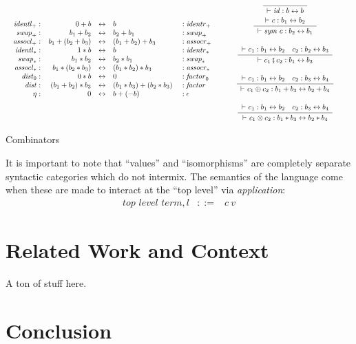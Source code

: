 \documentclass[authoryear,preprint]{sigplanconf}
\newcommand{\Rule}[4]{
\makebox{{\rm #1}
$\displaystyle
\frac{\begin{array}{l}#2\\\end{array}}
{\begin{array}{l}#3\\\end{array}}$
 #4}}
\newcommand{\proves}{\vdash}
\newcommand{\symc}[1]{\mathit{sym}~#1}
\newcommand{\jdg}[3]{#2 \proves_{#1} #3}
\newcommand{\iso}{\leftrightarrow}
\newcommand{\identlp}{\mathit{identl}_+}
\newcommand{\identrp}{\mathit{identr}_+}
\newcommand{\swapp}{\mathit{swap}_+}
\newcommand{\assoclp}{\mathit{assocl}_+}
\newcommand{\assocrp}{\mathit{assocr}_+}
\newcommand{\identlt}{\mathit{identl}_*}
\newcommand{\identrt}{\mathit{identr}_*}
\newcommand{\swapt}{\mathit{swap}_*}
\newcommand{\assoclt}{\mathit{assocl}_*}
\newcommand{\assocrt}{\mathit{assocr}_*}
\newcommand{\distz}{\mathit{dist}_0}
\newcommand{\factorz}{\mathit{factor}_0}
\newcommand{\dist}{\mathit{dist}}
\newcommand{\factor}{\mathit{factor}}
\newcommand{\idc}{\mathit{id}}
\begin{document}
\begin{table*}[t]
\[\begin{array}{cc}
\begin{array}{rrcll}
\identlp :&  0 + b & \iso & b &: \identrp \\
\swapp :&  b_1 + b_2 & \iso & b_2 + b_1 &: \swapp \\
\assoclp :&  b_1 + (b_2 + b_3) & \iso & (b_1 + b_2) + b_3 &: \assocrp \\
\identlt :&  1 * b & \iso & b &: \identrt \\
\swapt :&  b_1 * b_2 & \iso & b_2 * b_1 &: \swapt \\
\assoclt :&  b_1 * (b_2 * b_3) & \iso & (b_1 * b_2) * b_3 &: \assocrt \\
\distz :&~ 0 * b & \iso & 0 &: \factorz \\
\dist :&~ (b_1 + b_2) * b_3 & \iso & (b_1 * b_3) + (b_2 * b_3)~ &: \factor \\
\eta :&~ 0 & \iso & b + (-b)~ & : \epsilon
\end{array}
& 
\begin{minipage}{0.5\textwidth}
\begin{center} 
\Rule{}
{}
{\jdg{}{}{\idc : b \iso b}}
{}
\qquad\qquad
\Rule{}
{\jdg{}{}{c : b_1 \iso b_2}}
{\jdg{}{}{\symc{c} : b_2 \iso b_1}}
{}
\\ \bigskip
\Rule{}
{\jdg{}{}{c_1 : b_1 \iso b_2} \quad c_2 : b_2 \iso b_3}
{\jdg{}{}{c_1 \fatsemi c_2 : b_1 \iso b_3}}
{}
\\ \bigskip
\Rule{}
{\jdg{}{}{c_1 : b_1 \iso b_2} \quad c_2 : b_3 \iso b_4}
{\jdg{}{}{c_1 \oplus c_2 : b_1 + b_3 \iso b_2 + b_4}}
{}
\\ \bigskip
\Rule{}
{\jdg{}{}{c_1 : b_1 \iso b_2} \quad c_2 : b_3 \iso b_4}
{\jdg{}{}{c_1 \otimes c_2 : b_1 * b_3 \iso b_2 * b_4}}
{}
\end{center}
\end{minipage}
\end{array}\]
\caption{Combinators\label{pi-combinators}}
\end{table*}

It is important to note that ``values'' and ``isomorphisms'' are completely
separate syntactic categories which do not intermix. The semantics of the
language come when these are made to interact at the ``top level'' via
\emph{application}: 
\[\begin{array}{lrcl}
\textit{top level term}, l &::=& c~v
\end{array}\]

\section{Related Work and Context}

A ton of stuff here. 

\section{Conclusion}


\softraggedright

\end{document}

